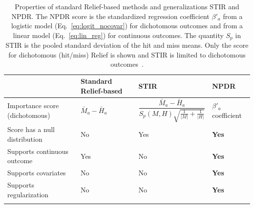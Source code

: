 \documentclass{bioinfo}
\begin{document}
\begin{table}[h]
\centering
\begin{tabular}{p{4.5cm}p{3cm}p{3.5cm}p{2.5cm}}
                           & Standard Relief-based & STIR    & NPDR \\
\hline
Importance score (dichotomous)  & $\bar{M}_a - \bar{H}_a$  & $\dfrac{\bar{M}_a - \bar{H}_a }{S_p(M,H)\sqrt{\frac{1}{|M|}+\frac{1}{|H|}}}$ &  $\beta'_a$ coefficient \\
Score has a null distribution & No                               & Yes     & {\bf Yes}  \\
Supports continuous outcome   & Yes                              & No      & {\bf Yes}  \\
Supports covariates           & No                               & No      & {\bf Yes} \\
Supports regularization           & No                               & No      & {\bf Yes} \\
\hline\\
\end{tabular}
\caption{Properties of standard Relief-based methods and generalizations STIR and NPDR. The NPDR score is the standardized regression coefficient $\beta'_a$ from a logistic model (Eq.~\ref{eq:logit_nocovar}) for dichotomous outcomes and from a linear model (Eq.~\ref{eq:lin_reg}) for continuous outcomes. The quantity $S_p$ in STIR is the pooled standard deviation of the hit and miss means. Only the score for dichotomous (hit/miss) Relief is shown and STIR is limited to dichotomous outcomes~\citep{stir}.}
\label{tab:compare_npdr}
\end{table}


% 
\end{document}
